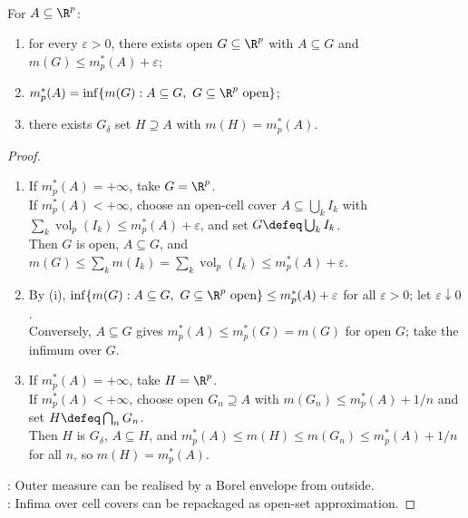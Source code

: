 \begin{lemma} \label{lem:outer-approximation-by-open-gdelta} \\
For $A\subseteq\R^p$:
\begin{enumerate}[label=(\roman*)]
\setlength{\itemsep}{0pt}
\item for every $\varepsilon>0$, there exists open $G\subseteq\R^p$ with $A\subseteq G$ and $m(G)\leq m_p^\ast(A)+\varepsilon$;
\item $m_p^\ast(A)=\inf\{m(G):A\subseteq G,\ G\subseteq\R^p\text{ open}\}$;
\item there exists $G_\delta$ set $H\supseteq A$ with $m(H)=m_p^\ast(A)$.
\end{enumerate}
\begin{proof}
\begin{enumerate}[label=(\roman*)]
\setlength{\itemsep}{0pt}
\item If $m_p^\ast(A)=+\infty$, take $G=\R^p$.\\
If $m_p^\ast(A)<+\infty$, choose an open-cell cover $A\subseteq\bigcup_k I_k$ with $\sum_k\operatorname{vol}_p(I_k)\leq m_p^\ast(A)+\varepsilon$, and set $G\defeq\bigcup_kI_k$.\\
Then $G$ is open, $A\subseteq G$, and $m(G)\leq\sum_km(I_k)=\sum_k\operatorname{vol}_p(I_k)\leq m_p^\ast(A)+\varepsilon$.
\item By (i), $\inf\{m(G):A\subseteq G,\ G\subseteq\R^p\text{ open}\}\leq m_p^\ast(A)+\varepsilon$ for all $\varepsilon>0$; let $\varepsilon\downarrow0$.\\
Conversely, $A\subseteq G$ gives $m_p^\ast(A)\leq m_p^\ast(G)=m(G)$ for open $G$; take the infimum over $G$.
\item If $m_p^\ast(A)=+\infty$, take $H=\R^p$.\\
If $m_p^\ast(A)<+\infty$, choose open $G_n\supseteq A$ with $m(G_n)\leq m_p^\ast(A)+1/n$ and set $H\defeq\bigcap_nG_n$.\\
Then $H$ is $G_\delta$, $A\subseteq H$, and $m_p^\ast(A)\leq m(H)\leq m(G_n)\leq m_p^\ast(A)+1/n$ for all $n$, so $m(H)=m_p^\ast(A)$.
\end{enumerate}
: Outer measure can be realised by a Borel envelope from outside.\\
: Infima over cell covers can be repackaged as open-set approximation.
\end{proof}
\end{lemma}

